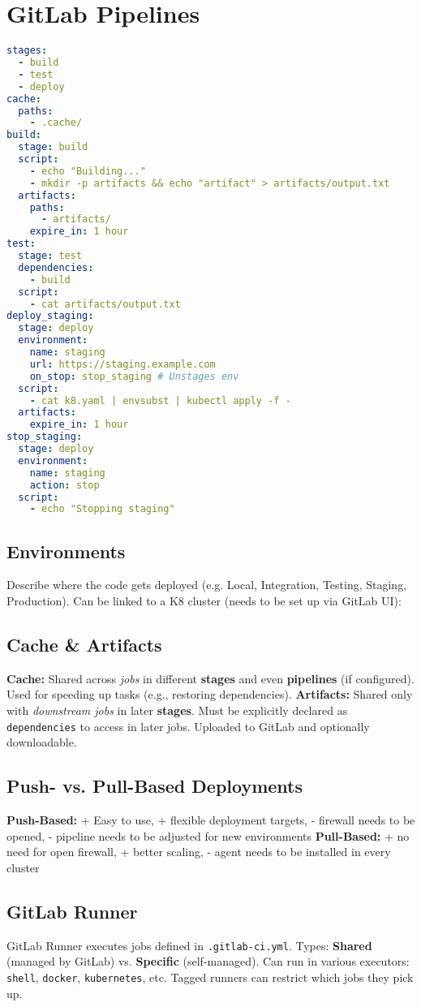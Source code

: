 \section{GitLab Pipelines}
\begin{lstlisting}[language=yaml]
stages:
  - build
  - test
  - deploy
cache:
  paths:
    - .cache/
build:
  stage: build
  script:
    - echo "Building..."
    - mkdir -p artifacts && echo "artifact" > artifacts/output.txt
  artifacts:
    paths:
      - artifacts/
    expire_in: 1 hour
test:
  stage: test
  dependencies:
    - build
  script:
    - cat artifacts/output.txt
deploy_staging:
  stage: deploy
  environment:
    name: staging
    url: https://staging.example.com
    on_stop: stop_staging # Unstages env
  script:
    - cat k8.yaml | envsubst | kubectl apply -f -
  artifacts:
    expire_in: 1 hour
stop_staging:
  stage: deploy
  environment:
    name: staging
    action: stop
  script:
    - echo "Stopping staging"
\end{lstlisting}
\subsection{Environments}
Describe where the code gets deployed (e.g. Local, Integration, Testing, Staging, Production). Can be linked to a K8 cluster (needs to be set up via GitLab UI):

\subsection{Cache \& Artifacts}
\textbf{Cache:} Shared across \textit{jobs} in different \textbf{stages} and even \textbf{pipelines} (if configured). Used for speeding up tasks (e.g., restoring dependencies).
\textbf{Artifacts:} Shared only with \textit{downstream jobs} in later \textbf{stages}. Must be explicitly declared as \texttt{dependencies} to access in later jobs. Uploaded to GitLab and optionally downloadable.
\subsection{Push- vs. Pull-Based Deployments}
\textbf{Push-Based:} + Easy to use, + flexible deployment targets, - firewall needs to be opened, - pipeline needs to be adjusted for new environments \textbf{Pull-Based:} + no need for open firewall, + better scaling, - agent needs to be installed in every cluster

\subsection{GitLab Runner}
GitLab Runner executes jobs defined in \texttt{.gitlab-ci.yml}.
Types: \textbf{Shared} (managed by GitLab) vs. \textbf{Specific} (self-managed).
Can run in various executors: \texttt{shell}, \texttt{docker}, \texttt{kubernetes}, etc.
Tagged runners can restrict which jobs they pick up.
